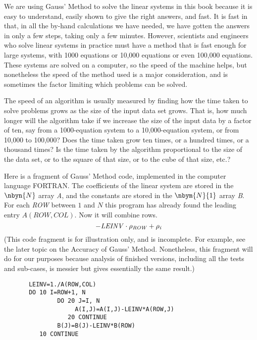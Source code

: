 %
%
We are using Gauss' Method to solve the linear systems in this book
because it is easy to understand, easily shown to give the right
answers, and fast.
It is fast in that, in all the by-hand calculations we have needed, 
we have gotten the answers in only a few steps, taking only a few minutes.
However,
scientists and engineers who solve linear systems in practice must 
have a method that is fast enough for large
systems, with 1000 equations or 10,000 equations or even 100,000 equations.
These systems are solved on a computer, so the speed of the
machine helps, but nonetheless the speed of the method used is a major
consideration, and is sometimes the factor limiting which problems
can be solved. 

The speed of an algorithm is usually measured by finding 
how the time taken to solve problems grows as the size of
the input data set grows. 
That is, how much longer will the algorithm take if
we increase the size of the input data by a
factor of ten, say from a 1000-equation system to a 10,000-equation
system, or from 10,000 to 100,000?
Does the time taken grow ten times,
or a hundred times, or a thousand times?
Is the time taken by the algorithm proportional to the size of the data set, 
or to the square of that size, or to the cube of that size, etc.? 

Here is a fragment of Gauss' Method code, implemented in the computer
language FORTRAN.
The coefficients of the linear system are stored in the 
$\nbyn{N}$ array \textit{A}, and the constants are stored in the 
$\nbym{N}{1}$ array \textit{B}.
For each \textit{ROW} between $1$ and $N$ this program
has already found the leading entry $A(ROW,COL)$.
Now it will combine rows.
\begin{equation*}
  -\text{\textit{LEINV}}\cdot \rho_{\text{\textit{ROW}}}
      +\rho_{\text{\textit{i}}}
\end{equation*}
(This code fragment is for illustration only, and is incomplete.
For example, see the later topic on the Accuracy of Gauss' Method.
Nonetheless, this fragment will do for our purposes because
analysis of finished versions, including all the tests
and sub-cases, is messier but gives essentially the same result.)
\begin{center}{\small
\begin{verbatim}
       LEINV=1./A(ROW,COL)
       DO 10 I=ROW+1, N
               DO 20 J=I, N
                    A(I,J)=A(I,J)-LEINV*A(ROW,J)
                  20 CONTINUE
               B(J)=B(J)-LEINV*B(ROW)
          10 CONTINUE
\end{verbatim} 
}\end{center}

